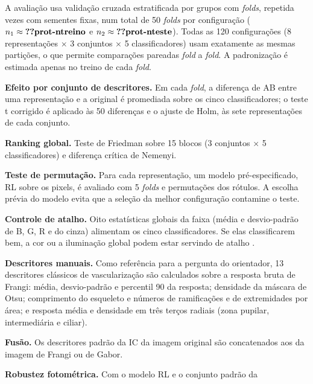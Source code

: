 A avaliação usa validação cruzada estratificada por grupos com
 \emph{folds}, repetida  vezes com sementes
fixas, num total de 50 \emph{folds} por configuração ($n_1\approx
\val{prot-ntreino}$ e $n_2\approx\val{prot-nteste}$). Todas as 120
configurações (8 representações $\times$ 3 conjuntos $\times$ 5
classificadores) usam exatamente as mesmas partições, o que permite comparações
pareadas \emph{fold} a \emph{fold}. A padronização é estimada apenas no
treino de cada \emph{fold}.

\label{sec:complementares}

\begin{alineas}
  \item \textbf{Efeito por conjunto de descritores.} Em cada \emph{fold}, a
  diferença de AB entre uma representação e a original é promediada sobre os
  cinco classificadores; o teste t corrigido é aplicado às 50 diferenças e o
  ajuste de Holm, às sete representações de cada conjunto.
  \item \textbf{Ranking global.} Teste de Friedman sobre 15 blocos (3
  conjuntos $\times$ 5 classificadores) e diferença crítica de Nemenyi.
  \item \textbf{Teste de permutação.} Para cada representação, um modelo
  pré-especificado, RL sobre os pixels, é avaliado com 5 \emph{folds} e
   permutações dos rótulos. A escolha prévia do modelo evita
  que a seleção da melhor configuração contamine o teste.
  \item \textbf{Controle de atalho.} Oito estatísticas globais da faixa
  (média e desvio-padrão de B, G, R e do cinza) alimentam os cinco
  classificadores. Se elas classificarem bem, a cor ou a iluminação global
  podem estar servindo de atalho \citep*{Geirhos2020,Zech2018}.
  \item \textbf{Descritores manuais.} Como referência para a pergunta do
  orientador, 13 descritores clássicos de vascularização são calculados
  sobre a resposta bruta de Frangi: média, desvio-padrão e percentil 90 da
  resposta; densidade da máscara de Otsu; comprimento do esqueleto e números
  de ramificações e de extremidades por área; e resposta média e densidade em
  três terços radiais (zona pupilar, intermediária e ciliar).
  \item \textbf{Fusão.} Os descritores padrão da IC da imagem original são
  concatenados aos da imagem de Frangi ou de Gabor.
  \item \textbf{Robustez fotométrica.} Com o modelo RL e o conjunto padrão da

\end{alineas}
